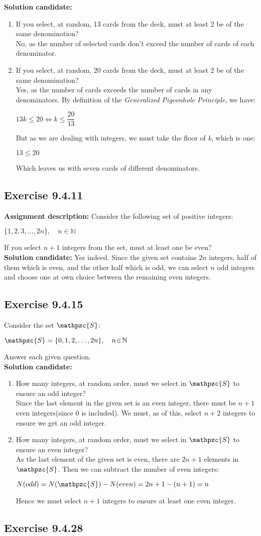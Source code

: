 \documentclass{report}
\newcommand{\cent}[1]{\begin{center}#1\end{center}}
\newcommand{\doubleN}{\mathbb{N}}
\newcommand{\In}{\! \in \!}
\newcommand{\script}[1]{\mathpzc{#1}}
\newcommand{\AssignmentDescription}{\textbf{Assignment description: }}
\newcommand{\Solution}{\textbf{Solution candidate: }}
\newcommand{\Exercise}[1]{\subsection{Exercise #1}}
\newcommand{\defaultEnumerateLabel}{\textbf{\alph*.}}
\newcommand{\MyItem}[1]{\item #1\\}
\newcommand{\LetterEnumeration}[1]{\begin{enumerate}[label = \defaultEnumerateLabel]
		#1
\end{enumerate}}
\begin{document}
 	
 	\Solution
 	
 	\LetterEnumeration{
 		\MyItem{If you select, at random, 13 cards from the deck, must at least 2 be of the same denomination?}
 		
 		No, as the number of selected cards don't exceed the number of cards of each denominator.\\
 		
 		\MyItem{If you select, at random, 20 cards from the deck, must at least 2 be of the same denomination?}
 		
 		Yes, as the number of cards exceeds the number of cards in any denominators. By definition of the \textit{Generalized Pigeonhole Principle}, we have:
 		
 		\cent{$13k \leq 20 \Leftrightarrow k \leq \dfrac{20}{13}$}
 		
 		But as we are dealing with integers, we must take the floor of \textit{k}, which is one:
 		
 		\cent{$13 \leq 20$}
 		
 		Which leaves us with seven cards of different denominators.\\
 	}
 	
 	\Exercise{9.4.11}
 	
 	\AssignmentDescription
 	Consider the following set of positive integers:
 	
 	\cent{$\{1,2,3,\dots,2n\}, \quad n \In \doubleN$}
 	
 	If you select $n+1$ integers from the set, must at least one be even?\\
 	
 	\Solution
 	Yes indeed. Since the given set contains $2n$ integers, half of them which is even, and the other half which is odd, we can select $n$ odd integers and choose one at own choice between the remaining even integers. 
 	
 	\Exercise{9.4.15}
 	
 	Consider the set $\script{S}$:
 	
 	\cent{$\script{S} = \{0,1,2, \dots,2n\}, \quad n \In \doubleN$}
 	
 	Answer each given question.\\
 	
 	\Solution
 	\LetterEnumeration{
 		\MyItem{How many integers, at random order, must we select in $\script{S}$ to ensure an odd integer?}
 		
 		Since the last element in the given set is an even integer, there must be $n+1$ even integers(since 0 is included). We must, as of this, select $n+2$ integers to ensure we get an odd integer. \\
 		
 		\MyItem{How many integers, at random order, must we select in $\script{S}$ to ensure an even integer?}
 		
 		As the last element of the given set is even, there are $2n+1$ elements in $\script{S}$. Then we can subtract the number of even integers:
 		
 		\cent{$N(odd)= N(\script{S}) - N(even) = 2n+1 - (n+1) = n$}
 		
 		Hence we must select $n+1$ integers to ensure at least one even integer.\\
 	}
 	\Exercise{9.4.28}
 	
\end{document}
